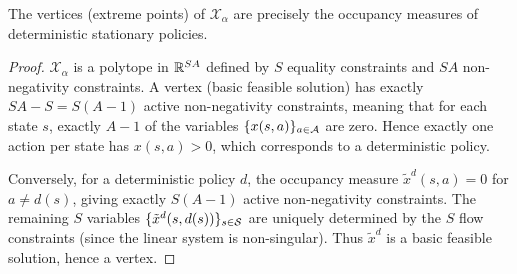 \documentclass[11pt,a4paper]{article}
\begin{document}
\begin{proposition}
\label{prop:vertices}
The vertices (extreme points) of $\mathcal{X}_\alpha$ are
precisely the occupancy measures of deterministic stationary policies.
\end{proposition}

\begin{proof}
$\mathcal{X}_\alpha$ is a polytope in $\mathbb{R}^{SA}$ defined by $S$
equality constraints and $SA$ non-negativity constraints. A vertex
(basic feasible solution) has exactly $SA - S = S(A-1)$ active
non-negativity constraints, meaning that for each state $s$,
exactly $A - 1$ of the variables $\{x(s,a)\}_{a \in \mathcal{A}}$
are zero. Hence exactly one action per state has $x(s,a) > 0$,
which corresponds to a deterministic policy.

Conversely, for a deterministic policy $d$, the occupancy measure
$\tilde{x}^d(s,a) = 0$ for $a \neq d(s)$, giving exactly
$S(A-1)$ active non-negativity constraints. The remaining $S$
variables $\{\tilde{x}^d(s, d(s))\}_{s \in \mathcal{S}}$ are
uniquely determined by the $S$ flow constraints (since the linear
system is non-singular). Thus $\tilde{x}^d$ is a basic feasible
solution, hence a vertex.
\end{proof}
\end{document}
